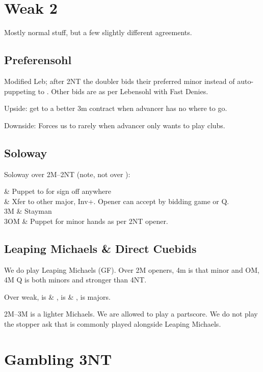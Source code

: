 \documentclass[tom-ari]{subfile}
\begin{document}
	\section{Weak 2}
	
	Mostly normal stuff, but a few slightly different agreements.
	
	\subsection{Preferensohl}
	
	Modified Leb; after 2NT the doubler bids their preferred minor instead of auto-puppeting to . Other bids are as per Lebensohl with Fast Denies.
	
	Upside: get to a better 3m contract when advancer has no where to go.
	
	Downside: Forces us to  rarely when advancer only wants to play clubs. 
	
	\subsection{Soloway}

	Soloway over 2M--2NT (note, not over ):
	
	\begin{bidtable}{}
		 & Puppet to  for sign off anywhere \\
		 & Xfer to other major, Inv+. Opener can accept by bidding game or Q. \\
		3M & Stayman \\
		3OM & Puppet for minor hands as per 2NT opener. \\
	\end{bidtable}

	\subsection{Leaping Michaels \& Direct Cuebids}
	
	We do play Leaping Michaels (GF). Over 2M openers, 4m is that minor and OM, 4M Q is both minors and stronger than 4NT. 
	
	Over  weak,  is \clubsuit \& \heartsuit,  is \clubsuit \& \spadesuit,  is majors.
	
	2M--3M is a lighter Michaels. We are allowed to play a partscore. We do not play the stopper ask that is commonly played alongside Leaping Michaels.
		
	\section{Gambling 3NT}
	
\end{document}
